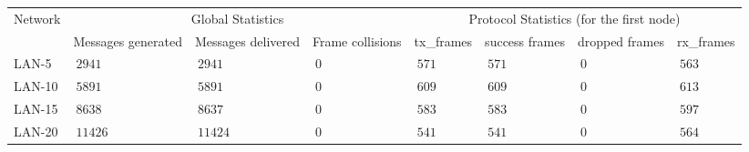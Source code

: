 \documentclass[12pt]{article}
\begin{document}

\begin{center}
\footnotesize
\begin{tabular}{|l || p{0.6in}|p{0.6in}|p{0.6in} || p{0.6in}|p{0.6in}|p{0.6in}|p{0.6in} |}
\hline
Network	&\multicolumn{3}{c||}{Global Statistics}
	&\multicolumn{4}{c|}{Protocol Statistics (for the first node)} \\
	\cline{2-8}
	&Messages generated
	&Messages delivered
	&Frame collisions
	&tx\_frames
	&success frames
	&dropped frames
	&rx\_frames \\
\hline \hline
LAN-5    &$\ 2941$ &$\ 2941$ &$\ 0$
	 &$\ 571$ &$\ 571$ &$\ 0$ &$\ 563$ \\
\hline
LAN-10    &$\ 5891$ &$\ 5891$ &$\ 0$
	  &$\ 609$ &$\ 609$ &$\ 0$ &$\ 613$\\
\hline
LAN-15    &$\ 8638$ &$\ 8637$ &$\ 0$
	  &$\ 583$ &$\ 583$ &$\ 0$ &$\ 597$\\
\hline
LAN-20    &$\ 11426$ &$\ 11424$ &$\ 0$
	  &$\ 541$ &$\ 541$ &$\ 0$ &$\ 564$\\
\hline
\end{tabular}
\end{center}
\normalsize
\end{document}
